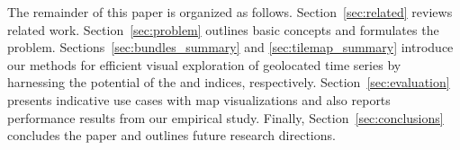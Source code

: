 The remainder of this paper is organized as follows. Section~\ref{sec:related} reviews related work. %
Section~\ref{sec:problem} outlines basic concepts and formulates the problem. Sections~\ref{sec:bundles_summary} and \ref{sec:tilemap_summary} introduce our methods for efficient visual exploration of geolocated time series by harnessing the potential of the \btsr and \hisax indices, respectively. Section~\ref{sec:evaluation} presents indicative use cases with map visualizations and also reports performance results from our empirical study. Finally, Section~\ref{sec:conclusions} concludes the paper and outlines future research directions.